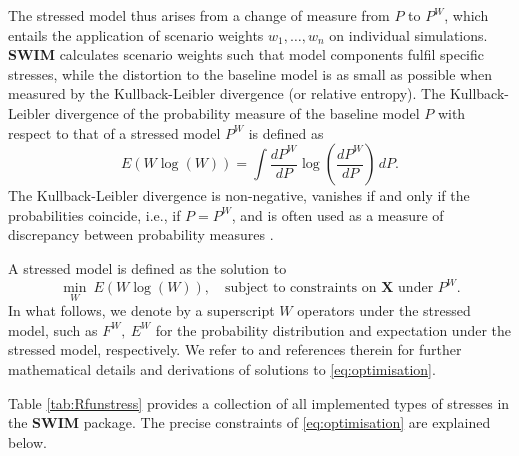 \documentclass[
]{article}
\begin{document}
The stressed model thus arises from a change of measure from \(P\) to \(P^W\), which entails the application of scenario weights \(w_1,\dots, w_n\) on individual simulations. \textbf{SWIM} calculates scenario weights such that model components fulfil specific stresses, while the distortion to the baseline model is as small as possible when measured by the Kullback-Leibler divergence (or relative entropy). The Kullback-Leibler divergence of the probability measure of the baseline model \(P\) with respect to that of a stressed model \(P^W\) is defined as
\begin{equation} 
E(W \log (W)) = \int  \frac{dP^W}{dP} \log \left( \frac{dP^W}{dP}\right)\, dP.
\end{equation}
The Kullback-Leibler divergence is non-negative, vanishes if and only if the probabilities coincide, i.e., if \(P = P^W\), and is often used as a measure of discrepancy between probability measures \citep{Pesenti2019}.

A stressed model is defined as the solution to
\begin{equation} 
\min_{ W } ~E(W \log (W)), \quad
\text{subject to constraints on } \mathbf X \text{ under } P^W.
\label{eq:optimisation}
\end{equation}
In what follows, we denote by a superscript \(W\) operators under the stressed model, such as \(F^W, ~ E^W\) for the probability distribution and expectation under the stressed model, respectively. We refer to \citet{Pesenti2019} and references therein for further mathematical details and derivations of solutions to \eqref{eq:optimisation}.

Table \ref{tab:Rfunstress} provides a collection of all implemented types of stresses in the \textbf{SWIM} package. The precise constraints of \eqref{eq:optimisation} are explained below.
\end{document}
